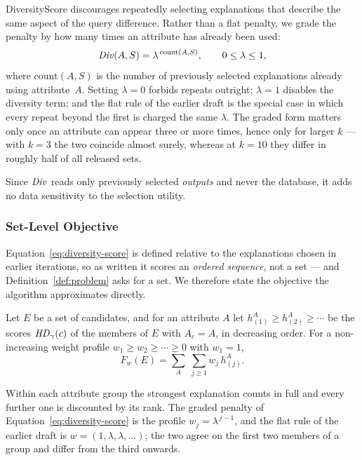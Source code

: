 DiversityScore discourages repeatedly selecting explanations that describe the same aspect of the query difference.
Rather than a flat penalty, we grade the penalty by how many times an attribute has already been used:
\begin{equation}
\mathit{Div}(A,S)=\lambda^{\,\mathrm{count}(A,S)},
\qquad 0\le\lambda\le1,
\label{eq:diversity-score}
\end{equation}
where $\mathrm{count}(A,S)$ is the number of previously selected explanations already using attribute~$A$.
Setting $\lambda=0$ forbids repeats outright; $\lambda=1$ disables the diversity term; and the flat rule of the earlier draft is the special case in which every repeat beyond the first is charged the same $\lambda$.
The graded form matters only once an attribute can appear three or more times, hence only for larger $k$ --- with $k=3$ the two coincide almost surely, whereas at $k=10$ they differ in roughly half of all released sets.

Since $\mathit{Div}$ reads only previously selected \emph{outputs} and never the database, it adds no data sensitivity to the selection utility.

\subsubsection{Set-Level Objective}
\label{subsubsec:set-objective}

Equation~\eqref{eq:diversity-score} is defined relative to the explanations chosen in earlier iterations, so as written it scores an \emph{ordered sequence}, not a set --- and Definition~\ref{def:problem} asks for a set.
We therefore state the objective the algorithm approximates directly.

\begin{definition}
\label{def:setobj}
Let $E$ be a set of candidates, and for an attribute $A$ let
$h^A_{(1)}\ge h^A_{(2)}\ge\cdots$ be the scores $\mathit{HD}_\gamma(c)$ of the members of $E$ with $A_c=A$, in decreasing order.
For a non-increasing weight profile $w_1\ge w_2\ge\cdots\ge0$ with $w_1=1$,
\begin{equation}
F_w(E)=\sum_{A}\;\sum_{j\ge1} w_j\, h^A_{(j)} .
\label{eq:set-objective}
\end{equation}
\end{definition}

Within each attribute group the strongest explanation counts in full and every further one is discounted by its rank.
The graded penalty of Equation~\eqref{eq:diversity-score} is the profile $w_j=\lambda^{\,j-1}$, and the flat rule of the earlier draft is $w=(1,\lambda,\lambda,\dots)$; the two agree on the first two members of a group and differ from the third onwards.

